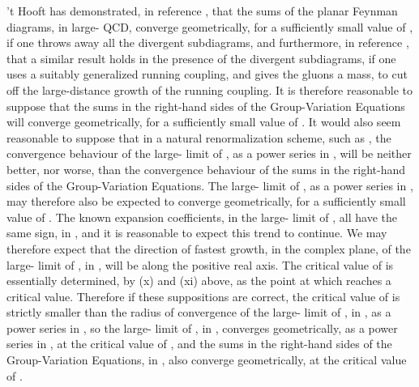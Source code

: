 \documentclass[a4paper,12pt,oneside]{article}
\begin{document}
't Hooft has demonstrated, in reference \cite{'t Hooft a}, that the sums 
of the planar Feynman diagrams, in
large-\coordHE{} QCD, converge geometrically, for a sufficiently small value of
\coordHE{}, if one throws away all the divergent subdiagrams, and furthermore,
in reference \cite{'t Hooft b}, that a similar result holds in the 
presence of the divergent subdiagrams, if
one uses a suitably generalized running coupling, and gives the gluons a
mass, to cut off the large-distance growth of the running
coupling.  It is therefore reasonable to suppose that the sums in the
right-hand sides of the Group-Variation Equations will converge
geometrically, for a sufficiently small value of \coordHE{}.  It would also seem
reasonable to suppose that in a natural renormalization scheme, such as \coordHE{} \cite{MS bar}, the convergence behaviour of the large-\coordHE{} limit of \coordHE{}, as
a power series in \coordHE{}, will be neither better, nor worse, than the
convergence behaviour of the sums in the right-hand sides of the
Group-Variation Equations.  The large-\coordHE{} limit of \coordHE{}, as a
power series in \coordHE{}, may therefore also be expected to converge
geometrically, for a sufficiently small value of \coordHE{}.  The known expansion
coefficients, in the large-\coordHE{} limit of \coordHE{}, all have the same
sign, in \coordHE{}, and it is reasonable to expect this trend to continue.  We
may therefore expect that the direction of fastest growth, in the complex
\coordHE{} plane, of the large-\coordHE{} limit of 
\coordHE{}, in \coordHE{}, will be
along the positive real axis.  The critical value of \coordHE{} is essentially
determined, by (x) and (xi) above, as the point at which 
\coordHE{}
reaches a critical value.  Therefore if these suppositions are correct, 
the critical value of \coordHE{} is 
strictly smaller than the radius of convergence of the large-\coordHE{} limit 
of \coordHE{}, in \coordHE{}, as a power series in \coordHE{}, 
so the large-\coordHE{} limit of \coordHE{}, in \coordHE{}, 
converges geometrically, as a power series in \coordHE{}, at the critical 
value of \coordHE{}, and the sums in the right-hand sides of the 
Group-Variation Equations, in \coordHE{}, also converge
geometrically, at the critical value of \coordHE{}.
\end{document}
